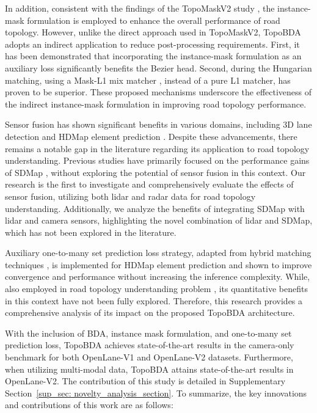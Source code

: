 In addition, consistent with the findings of the TopoMaskV2 study \cite{kalfaoglu2024topomaskv2}, the instance-mask formulation is employed to enhance the overall performance of road topology. However, unlike the direct approach used in TopoMaskV2, TopoBDA adopts an indirect application to reduce post-processing requirements. First, it has been demonstrated that incorporating the instance-mask formulation as an auxiliary loss significantly benefits the Bezier head. Second, during the Hungarian matching, using a Mask-L1 mix matcher \cite{li2023mask}, instead of a pure L1 matcher, has proven to be superior. These proposed mechanisms underscore the effectiveness of the indirect instance-mask formulation in improving road topology performance.

Sensor fusion has shown significant benefits in various domains, including 3D lane detection \cite{luo2024dv, luo2022m} and HDMap element prediction \cite{liu2024mgmap, zhang2024online, liao2022maptr, liu2023vectormapnet, li2022hdmapnet}. Despite these advancements, there remains a notable gap in the literature regarding its application to road topology understanding. Previous studies have primarily focused on the performance gains of SDMap \cite{luo2023augmenting, yang2024toposd}, without exploring the potential of sensor fusion in this context. Our research is the first to investigate and comprehensively evaluate the effects of sensor fusion, utilizing both lidar and radar data for road topology understanding. Additionally, we analyze the benefits of integrating SDMap with lidar and camera sensors, highlighting the novel combination of lidar and SDMap, which has not been explored in the literature.

Auxiliary one-to-many set prediction loss strategy, adapted from hybrid matching techniques \cite{jia2023detrs}, is implemented for HDMap element prediction \cite{liao2024maptrv2} and shown to improve convergence and performance without increasing the inference complexity. While, also employed in road topology understanding problem \cite{wu2023topomlp, kalfaoglu2024topomaskv2}, its quantitative benefits in this context have not been fully explored. Therefore, this research provides a comprehensive analysis of its impact on the proposed TopoBDA architecture.

With the inclusion of BDA, instance mask formulation, and one-to-many set prediction loss, TopoBDA achieves state-of-the-art results in the camera-only benchmark for both OpenLane-V1 and OpenLane-V2 datasets. Furthermore, when utilizing multi-modal data, TopoBDA attains state-of-the-art results in OpenLane-V2. The contribution of this study is detailed in Supplementary Section~\ref{sup_sec: novelty_analysis_section}. To summarize, the key innovations and contributions of this work are as follows:

